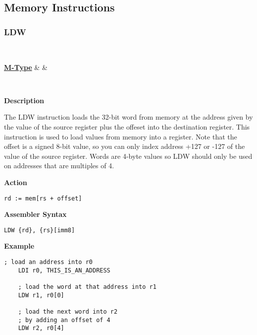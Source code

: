 \subsection{Memory Instructions}

\subsubsection{LDW }\label{sec:LDW}

\vspace{3ex}

\begin{center}
	\begin{bytefield}[leftcurly=., leftcurlyspace=0pt]{32}
		 \\
		\begin{leftwordgroup}{\hyperref[sec:m-type]{\textbf{M-Type}}}
		 & 
		 &
		\end{leftwordgroup}\\
	\end{bytefield}
\end{center}

\textbf{Description}

The LDW instruction loads the 32-bit word from memory at the address given by the value of the source register plus the offeset into the destination register.
This instruction is used to load values from memory into a register.
Note that the offset is a signed 8-bit value, so you can only index address +127 or -127 of the value of the source register.
Words are 4-byte values so LDW should only be used on addresses that are multiples of 4.

\vspace{3ex}

\textbf{Action}
\begin{lstlisting}[frame=single]
	rd := mem[rs + offset]
\end{lstlisting}

\vspace{3ex}

\textbf{Assembler Syntax}
\begin{lstlisting}[frame=single]
	LDW {rd}, {rs}[imm8]
\end{lstlisting}

\vspace{3ex}

\textbf{Example}
\begin{lstlisting}[frame=single]
	; load an address into r0
	LDI r0, THIS_IS_AN_ADDRESS
	
	; load the word at that address into r1
	LDW r1, r0[0]
	
	; load the next word into r2
	; by adding an offset of 4
	LDW r2, r0[4]
\end{lstlisting}

